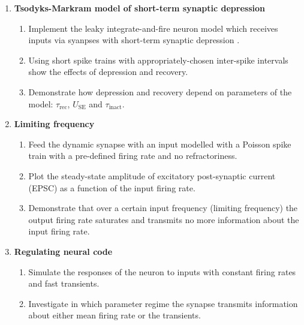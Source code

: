 \documentclass[12pt]{article}
\begin{document}
\begin{enumerate}
    \item \textbf{Tsodyks-Markram model of short-term synaptic
        depression}        

        \begin{enumerate}
            \item Implement the leaky integrate-and-fire neuron model
                which receives inputs via syanpses with short-term synaptic
                depression \citep{Tsodyks97}.
            \item Using short spike trains with appropriately-chosen inter-spike
                intervals show the effects of depression and recovery.
            \item Demonstrate how depression and recovery depend on
                parameters of the model: $\tau_{\mathrm{rec}}$,
                $U_{\mathrm{SE}}$ and $\tau_{\mathrm{inact}}$.
        \end{enumerate}

    \item \textbf{Limiting frequency}

        \begin{enumerate}
            \item Feed the dynamic synapse with an input modelled with
                a Poisson spike train with a pre-defined firing rate
                and no refractoriness.
            \item Plot the steady-state amplitude of excitatory post-synaptic
                current  (EPSC) as a function of the input firing
                rate.
            \item Demonstrate that over a certain input frequency
                (limiting frequency) the output firing rate saturates
                and transmits no more information about the input firing
                rate.
        \end{enumerate}

    \item \textbf{Regulating neural code}

        \begin{enumerate}
            \item Simulate the responses of the neuron to inputs with
            constant firing rates and fast transients.
        \item Investigate in which parameter regime the synapse
            transmits information about either mean firing rate or  the
            transients.
        \end{enumerate}


\end{enumerate}
\end{document}
